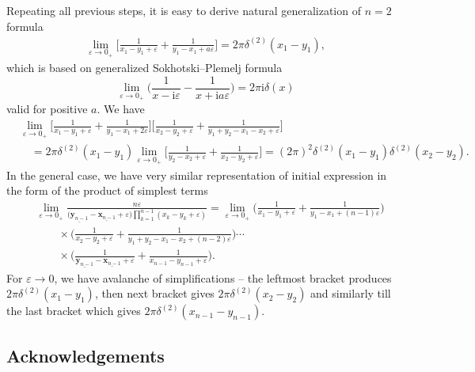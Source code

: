 \documentclass[10pt,a4paper]{amsart}
\renewcommand{\imath}{\mathrm{i}}
\numberwithin{equation}{section}
\begin{document}
Repeating all previous steps, it is easy to derive natural
generalization of $n=2$ formula
\begin{align*}
\lim\limits_{\varepsilon\to 0_+}
\biggl[
\frac{1}
{x_1-y_1+\varepsilon}+
\frac{1}
{y_1-x_1+a\varepsilon}\biggr] = 2\pi \delta^{(2)}(x_1-y_1),
\end{align*}
which is based on generalized Sokhotski–Plemelj formula
\begin{equation*}
	\lim\limits_{\varepsilon\to 0_+}
	\biggl(\frac{1}{x -\imath\varepsilon}
	- \frac{1}{x +\imath a \varepsilon}\biggr)
	= 2\pi\imath \delta(x)
\end{equation*}
valid for positive $a$.
We have
\begin{align*}
&
\lim\limits_{\varepsilon\to 0_+}
\biggl[
\frac{1}
{x_1-y_1+\varepsilon}+
\frac{1}
{y_1-x_1+2\varepsilon}\biggr]
\biggl[\frac{1}{x_2-y_2+\varepsilon}+
\frac{1}{y_1+y_2-x_1-x_2+\varepsilon}
\biggr] \\
& \quad =
2\pi \delta^{(2)}(x_1-y_1)
\lim\limits_{\varepsilon\to 0_+}
\biggl[
\frac{1}{y_2-x_2+\varepsilon}+\frac{1}{x_2-y_2+\varepsilon}
\biggr] = (2\pi)^2 \delta^{(2)}(x_1-y_1) \delta^{(2)}(x_2-y_2) .
\end{align*}
In the general case, we have very similar representation
of initial expression in the form of the product of simplest terms
\begin{align*}
&
\lim\limits_{\varepsilon\to 0_+}
\frac{n \varepsilon}
{\bigl(\underline{\bm{y}_{n-1}}-\underline{\bm{x}_{n-1}}+\varepsilon\bigr)
\prod_{k=1}^{n-1}(x_k-y_k+\varepsilon)} = \lim\limits_{\varepsilon\to 0_+}
\biggl(\frac{1}
{x_1-y_1+\varepsilon}+
\frac{1}
{y_1-x_1+(n-1)\varepsilon}\biggr) \\
&\qquad{} \times \biggl(\frac{1}{x_2-y_2+\varepsilon}+
\frac{1}{y_1+y_2-x_1-x_2+(n-2)\varepsilon}
\biggr)
\cdots \\
&\qquad{} \times
\biggl(\frac{1}{\underline{\bm{y}_{n-1}}-\underline{\bm{x}_{n-1}}+\varepsilon}+
\frac{1}{x_{n-1}-y_{n-1}+\varepsilon}\biggr).
\end{align*}
For $\varepsilon \to 0$, we have avalanche of simplifications --
the leftmost bracket produces $2\pi \delta^{(2)}(x_1-y_1)$,
then next bracket gives $2\pi \delta^{(2)}(x_2-y_2)$ and similarly till the last bracket which gives $2\pi \delta^{(2)}(x_{n-1}-y_{n-1})$.


\subsection*{Acknowledgements}
\end{document}
